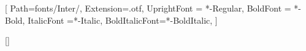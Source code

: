 \usepackage[left=0.5in, right=0.5in, top=0.5in, bottom=0.5in]{geometry}
\usepackage{paracol}
\usepackage{titlesec}
\usepackage{enumitem}
\usepackage{hyperref}
\usepackage{xurl}
\usepackage{tabularx}
\usepackage{fontspec}



\setmainfont{Inter}[
  Path=fonts/Inter/,
  Extension=.otf,
  UprightFont = *-Regular,
  BoldFont = *-Bold,
  ItalicFont =*-Italic,
  BoldItalicFont=*-BoldItalic,
]

\titleformat{\section}{\large\bfseries}{}{0em}{}[]

\newcommand{\job}[4]{%
  \noindent
  \textbf{#1} \hfill \textit{#3} \\
  \textit{#2} \\
  \vspace{-1.5em}
  \begin{itemize}[noitemsep, left=0pt]
      #4
  \end{itemize}
}

\newcommand{\project}[4]{
  \noindent
  \textbf{#1} \hfill \href{#3}{\url{#2}}
  \vspace{-0.5em}
  \begin{sloppypar}
    \begin{itemize}[noitemsep, left=0pt]
        #4
    \end{itemize}
  \end{sloppypar}
}

\newcommand{\education}[4]{
  \noindent
  \textbf{#1} \hfill \href{#3}{\url{#2}}
  \vspace{-0.5em}
  \begin{sloppypar}
    \begin{itemize}[noitemsep, left=0pt]
        #4
    \end{itemize}
  \end{sloppypar}
}

